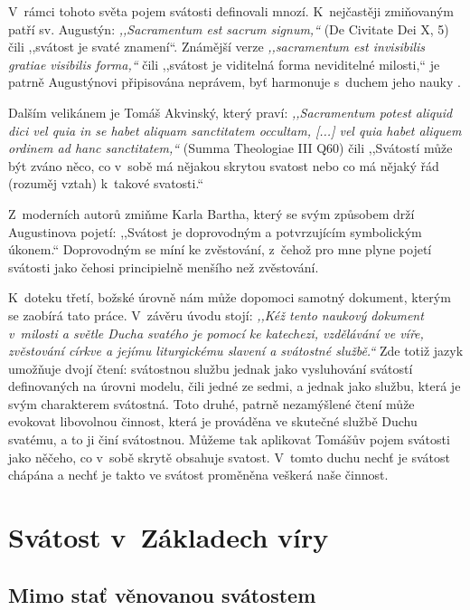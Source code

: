 V~rámci tohoto světa pojem svátosti definovali mnozí. K~nejčastěji zmiňovaným
patří sv. Augustýn: \textit{,,Sacramentum est sacrum signum,``} (De Civitate Dei
X, 5) čili ,,svátost je svaté znamení``. Známější verze
\textit{,,sacramentum est invisibilis gratiae visibilis forma,``} čili ,,svátost
je viditelná forma neviditelné milosti,`` je patrně Augustýnovi připisována
neprávem, byť harmonuje s~duchem jeho nauky \citep{king1967origin}.

Dalším velikánem je Tomáš Akvinský, který praví: \textit{,,Sacramentum potest
aliquid dici vel quia in se habet aliquam sanctitatem occultam, [...] vel quia
habet aliquem ordinem ad hanc sanctitatem,``} (Summa Theologiae III Q60) čili
,,Svátostí může být zváno něco, co v~sobě má nějakou skrytou svatost nebo co má
nějaký řád (rozuměj vztah) k~takové svatosti.``

Z~moderních autorů zmiňme Karla Bartha, který se svým způsobem drží Augustinova
pojetí: ,,Svátost je doprovodným a potvrzujícím symbolickým úkonem.``
\citep[I, 1]{barth1946kirchliche} Doprovodným se míní ke zvěstování, z~čehož pro
mne plyne pojetí svátosti jako čehosi principielně menšího než zvěstování.

K~doteku třetí, božské úrovně nám může dopomoci samotný dokument, kterým se
zaobírá tato práce. V~závěru úvodu stojí: \textit{,,Kéž tento naukový dokument
v~milosti a světle Ducha svatého je pomocí ke katechezi, vzdělávání ve víře,
zvěstování církve a jejímu liturgickému slavení a svátostné službě.``} Zde totiž
jazyk umožňuje dvojí čtení: svátostnou službu jednak jako vysluhování svátostí
definovaných na úrovni modelu, čili jedné ze sedmi, a jednak jako službu, která
je svým charakterem svátostná. Toto druhé, patrně nezamýšlené čtení může
evokovat libovolnou činnost, která je prováděna ve skutečné službě Duchu
svatému, a to ji činí svátostnou. Můžeme tak aplikovat Tomášův pojem svátosti
jako něčeho, co v~sobě skrytě obsahuje svatost. V~tomto duchu nechť je svátost
chápána a nechť je takto ve svátost proměněna veškerá naše činnost.

\vspace{15mm}
\chapter{Svátost v~Základech víry}
\label{div:zaklady}

\section{Mimo stať věnovanou svátostem}

